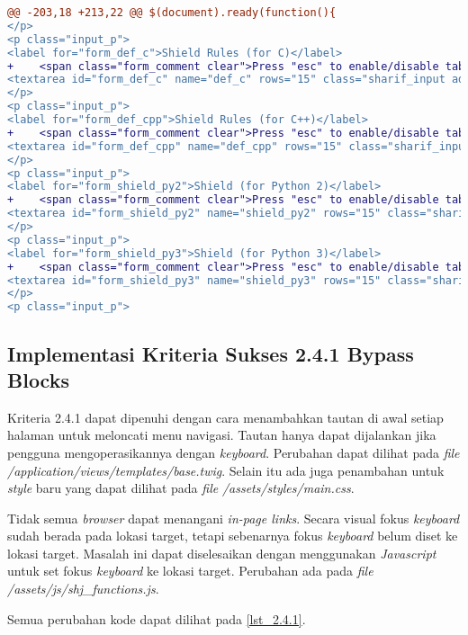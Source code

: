 \begin{lstlisting}[language=diff, caption=Perubahan untuk mematuhi kriteria 2.1.2, label=lst_2.1.2, basicstyle=\ttfamily, frame=single,
columns=fullflexible, keepspaces=true, breaklines=true]
@@ -203,18 +213,22 @@ $(document).ready(function(){
</p>
<p class="input_p">
<label for="form_def_c">Shield Rules (for C)</label>
+    <span class="form_comment clear">Press "esc" to enable/disable tabindent</span><br>
<textarea id="form_def_c" name="def_c" rows="15" class="sharif_input add_text clear">{{ defc }}</textarea>
</p>
<p class="input_p">
<label for="form_def_cpp">Shield Rules (for C++)</label>
+    <span class="form_comment clear">Press "esc" to enable/disable tabindent</span><br>
<textarea id="form_def_cpp" name="def_cpp" rows="15" class="sharif_input add_text clear">{{ defcpp }}</textarea>
</p>
<p class="input_p">
<label for="form_shield_py2">Shield (for Python 2)</label>
+    <span class="form_comment clear">Press "esc" to enable/disable tabindent</span><br>
<textarea id="form_shield_py2" name="shield_py2" rows="15" class="sharif_input add_text clear">{{ shield_py2 }}</textarea>
</p>
<p class="input_p">
<label for="form_shield_py3">Shield (for Python 3)</label>
+    <span class="form_comment clear">Press "esc" to enable/disable tabindent</span><br>
<textarea id="form_shield_py3" name="shield_py3" rows="15" class="sharif_input add_text clear">{{ shield_py3 }}</textarea>
</p>
<p class="input_p">
\end{lstlisting}

\subsection{Implementasi Kriteria Sukses 2.4.1 Bypass Blocks}
\label{subsec:implementasi_A_2.4.1}

Kriteria 2.4.1 dapat dipenuhi dengan cara menambahkan tautan di awal setiap halaman untuk meloncati menu navigasi. Tautan hanya dapat dijalankan jika pengguna mengoperasikannya dengan \textit{keyboard}. Perubahan dapat dilihat pada \textit{file} \textit{/application/views/templates/base.twig}. Selain itu ada juga penambahan untuk \textit{style} baru yang dapat dilihat pada \textit{file} \textit{/assets/styles/main.css}.

Tidak semua \textit{browser} dapat menangani \textit{in-page links}. Secara visual fokus \textit{keyboard} sudah berada pada lokasi target, tetapi sebenarnya fokus \textit{keyboard} belum diset ke lokasi target. Masalah ini dapat diselesaikan dengan menggunakan \textit{Javascript} untuk set fokus \textit{keyboard} ke lokasi target. Perubahan ada pada \textit{file} \textit{/assets/js/shj\_functions.js}.

Semua perubahan kode dapat dilihat pada \ref{lst_2.4.1}.

